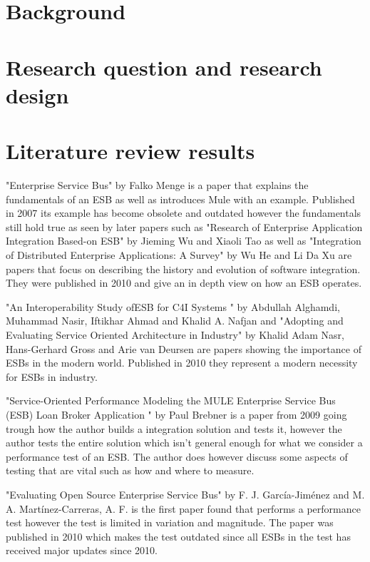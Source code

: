 \documentclass{llncs}
\begin{document}
\section{Background}
\label{sec:background}

\section{Research question and research design}
\label{sec:method}
\section{Literature review results}
\label{sec:litrev}


"Enterprise Service Bus" by Falko Menge is a paper that explains the fundamentals of an ESB as well as introduces Mule with an example. Published in 2007 its example has become obsolete and outdated however the fundamentals still hold true as seen by later papers such as "Research of Enterprise Application Integration Based-on ESB" by Jieming Wu and Xiaoli Tao as well as "Integration of Distributed Enterprise Applications: A Survey" by Wu He and Li Da Xu are papers that focus on describing the history and evolution of software integration.  They were published in 2010 and give an in depth view on how an ESB  operates.


"An Interoperability  Study  ofESB for C4I  Systems " by Abdullah Alghamdi, Muhammad Nasir, Iftikhar Ahmad and Khalid A. Nafjan and  "Adopting and Evaluating Service Oriented Architecture in Industry" by Khalid Adam Nasr, Hans-Gerhard Gross and Arie van Deursen are papers showing the importance of ESBs in the modern world. Published in 2010 they represent a modern necessity for ESBs in industry.


"Service-Oriented Performance Modeling the MULE Enterprise Service Bus (ESB) Loan Broker Application " by Paul Brebner is a paper from 2009 going trough how the author builds a integration solution and tests it, however the author tests the entire solution which isn't general enough for what we consider a performance test of an ESB. The author does however discuss some aspects of testing that are vital such as how and where to measure.

"Evaluating Open Source Enterprise Service Bus" by F. J. García-Jiménez and M. A. Martínez-Carreras, A. F. is the first paper found that performs a performance test however the test is limited in variation and magnitude. The paper was published in 2010 which makes the test outdated since all ESBs in the test has received major updates since 2010.
\end{document}
